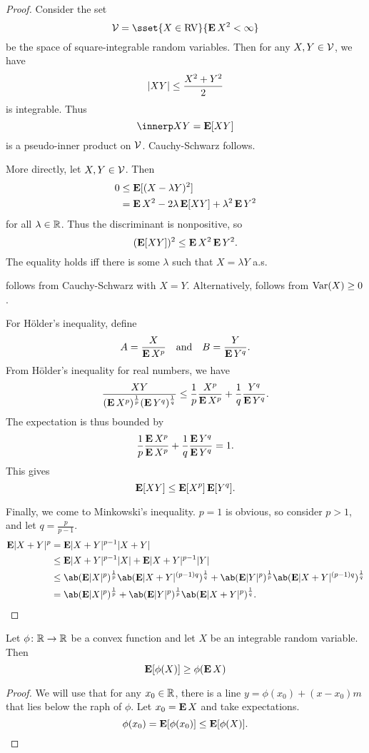 \begin{proof}
    Consider the set \[
        \mcV = \sset{X \in \RV}{\E X^2 < \infty}
    \] be the space of square-integrable random variables.
    Then for any $X, Y \in \mathcal{V}$, we have \[
        \lvert XY\rvert \le \frac{X^2 + Y^2}{2}
    \] is integrable.
    Thus \[
        \innerp XY = \E[XY]
    \] is a pseudo-inner product on $\mathcal{V}$.
    Cauchy-Schwarz follows.

    More directly, let $X, Y \in \mathcal{V}$.
    Then \begin{align*}
        0 &\le \operatorname{\mathbf E}[(X - \lambda Y)^2] \\
        &= \operatorname{\mathbf E} X^2 - 2 \lambda \operatorname{\mathbf E}[XY] + \lambda^2 \operatorname{\mathbf E} Y^2
    \end{align*} for all $\lambda \in \mathbb{R}$.
    Thus the discriminant is nonpositive, so \[
        (\operatorname{\mathbf E}[XY])^2 \le \operatorname{\mathbf E} X^2 \operatorname{\mathbf E} Y^2.
    \] The equality holds iff there is some $\lambda$ such that
    $X = \lambda Y$ a.s.

     follows from Cauchy-Schwarz
    with $X = Y$.
    Alternatively, follows from $\operatorname{Var}(X) \ge 0$.

    For H\"older's inequality, define \[
        A = \frac{X}{\operatorname{\mathbf E} X^p} \quad \text{and} \quad B = \frac{Y}{\operatorname{\mathbf E} Y^q}.
    \] From H\"older's inequality for real numbers, we have \[
        \frac{XY}{(\operatorname{\mathbf E} X^p)^{\frac1p} (\operatorname{\mathbf E} Y^q)^{\frac1q}}
        \le \frac1p \frac{X^p}{\operatorname{\mathbf E} X^p} + \frac1q \frac{Y^q}{\operatorname{\mathbf E} Y^q}.
    \] The expectation is thus bounded by \[
        \frac1p \frac{\operatorname{\mathbf E} X^p}{\operatorname{\mathbf E} X^p} + \frac1q \frac{\operatorname{\mathbf E} Y^q}{\operatorname{\mathbf E} Y^q} = 1.
    \] This gives \[
        \operatorname{\mathbf E}[XY] \le \operatorname{\mathbf E}[X^p] \operatorname{\mathbf E}[Y^q].
    \]

    Finally, we come to Minkowski's inequality.
    $p = 1$ is obvious, so consider $p > 1$, and let $q = \frac{p}{p-1}$.
    \begin{align*}
        \E\abs{X + Y}^p &= \E\abs{X + Y}^{p-1} \abs{X + Y} \\
        &\le \E\abs{X + Y}^{p-1} \abs X + \E\abs{X + Y}^{p-1} \abs Y \\
        &\le \ab(\E\abs X^p)^{\frac1p} \ab(\E\abs{X + Y}^{(p-1)q})^{\frac1q}
        + \ab(\E\abs Y^p)^{\frac1p} \ab(\E\abs{X + Y}^{(p-1)q})^{\frac1q} \\
        &= \ab(\E\abs X^p)^{\frac1p} + \ab(\E\abs Y^p)^{\frac1p}
            \ab(\E\abs{X + Y}^p)^{\frac1q}.
    \end{align*}
\end{proof}

\begin{theorem} \label{thm:exp:jensen}
    Let $\phi\colon \mathbb{R} \to \mathbb{R}$ be a convex function and let $X$ be
    an integrable random variable.
    Then \[
        \operatorname{\mathbf E}[\phi(X)] \ge \phi(\operatorname{\mathbf E} X)
    \]
\end{theorem}
\begin{proof}
    We will use that for any $x_0 \in \mathbb{R}$, there is a line
    $y = \phi(x_0) + (x - x_0)m$ that lies below the raph of $\phi$.
    Let $x_0 = \operatorname{\mathbf E} X$ and take expectations.
    \[
        \phi(x_0) = \operatorname{\mathbf E}[\phi(x_0)] \le \operatorname{\mathbf E}[\phi(X)].
    \]
\end{proof}
